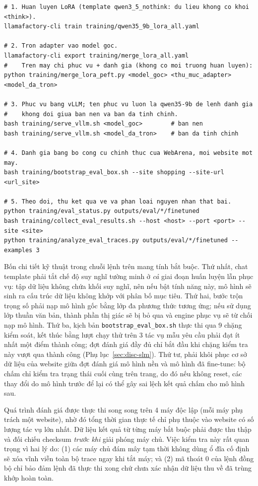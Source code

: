 \begin{lstlisting}[style=mystyle,numbers=none,basicstyle=\scriptsize\ttfamily]
# 1. Huan luyen LoRA (template qwen3_5_nothink: du lieu khong co khoi <think>).
llamafactory-cli train training/qwen35_9b_lora_all.yaml

# 2. Tron adapter vao model goc.
llamafactory-cli export training/merge_lora_all.yaml
#    Tren may chi phuc vu + danh gia (khong co moi truong huan luyen):
python training/merge_lora_peft.py <model_goc> <thu_muc_adapter> <model_da_tron>

# 3. Phuc vu bang vLLM; ten phuc vu luon la qwen35-9b de lenh danh gia
#    khong doi giua ban nen va ban da tinh chinh.
bash training/serve_vllm.sh <model_goc>        # ban nen
bash training/serve_vllm.sh <model_da_tron>    # ban da tinh chinh

# 4. Danh gia bang bo cong cu chinh thuc cua WebArena, moi website mot may.
bash training/bootstrap_eval_box.sh --site shopping --site-url <url_site>

# 5. Theo doi, thu ket qua ve va phan loai nguyen nhan that bai.
python training/eval_status.py outputs/eval/*/finetuned
bash training/collect_eval_results.sh --host <host> --port <port> --site <site>
python training/analyze_eval_traces.py outputs/eval/*/finetuned --examples 3
\end{lstlisting}

\noindent
Bốn chi tiết kỹ thuật trong chuỗi lệnh trên mang tính bắt buộc. Thứ nhất,
chat template phải tắt chế độ suy nghĩ tường minh ở \emph{cả} giai đoạn huấn luyện
lẫn phục vụ: tập dữ liệu không chứa khối suy nghĩ, nên nếu bật tính năng này, mô
hình sẽ sinh ra cấu trúc dữ liệu không khớp với phân bố mục tiêu. Thứ hai, bước
trộn trọng số phải nạp mô hình gốc bằng lớp đa phương thức tương ứng; nếu sử
dụng lớp thuần văn bản, thành phần thị giác sẽ bị bỏ qua và engine phục vụ sẽ
từ chối nạp mô hình. Thứ ba, kịch bản \texttt{bootstrap\_eval\_box.sh} thực thi
qua 9 chặng kiểm soát, kết thúc bằng lượt chạy thử trên 3 tác vụ
mẫu yêu cầu phải đạt ít nhất một điểm thành công; đợt đánh giá đầy đủ chỉ bắt đầu
khi chặng kiểm tra này vượt qua thành công (Phụ lục~\ref{sec:disc-slm}). Thứ tư,
phải khôi phục cơ sở dữ liệu của website giữa đợt đánh giá mô
hình nền và mô hình đã fine-tune: bộ chấm chỉ kiểm tra trạng thái cuối cùng trên
trang, do đó nếu không reset, các thay đổi do mô hình trước để lại có thể gây
sai lệch kết quả chấm cho mô hình sau.

Quá trình đánh giá được thực thi song song trên 4 máy độc lập (mỗi máy phụ trách
một website), nhờ đó tổng thời gian thực tế chỉ phụ thuộc vào website có số lượng
tác vụ lớn nhất. Dữ liệu kết quả từ từng máy bắt buộc phải được thu thập và đối chiếu checksum \emph{trước khi} giải phóng máy chủ. Việc kiểm tra này
rất quan trọng vì hai lý do: (1) các máy chủ đám mây tạm thời không dùng ổ đĩa
cố định sẽ xóa vĩnh viễn toàn bộ trace ngay khi tắt máy; và (2)
mã thoát 0 của lệnh đồng bộ chỉ bảo đảm lệnh đã thực thi xong chứ chưa xác nhận
dữ liệu thu về đã trùng khớp hoàn toàn.

